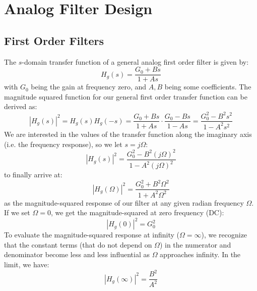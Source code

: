 \section{Analog Filter Design}

\subsection{First Order Filters}
The $s$-domain transfer function of a general analog first order filter is given by:
\begin{equation}
 H_g(s) = \frac{G_0 + B s}{1 + A s}
\end{equation}
with $G_0$ being the gain at frequency zero, and $A, B$ being some coefficients. The magnitude squared function for our general first order transfer function can be derived as:
\begin{equation}
 |H_g(s)|^2 = H_g(s) H_g(-s) 
 = \frac{G_0 + B s}{1 + A s} \cdot \frac{G_0 - B s}{1 - A s} 
 = \frac{G_0^2 - B^2 s^2}{1 - A^2 s^2} 
\end{equation}
We are interested in the values of the transfer function along the imaginary axis (i.e. the frequency response), so we let $s = j \Omega$:
\begin{equation}
 |H_g(s)|^2 = \frac{G_0^2 - B^2 (j \Omega)^2}{1 - A^2 (j \Omega)^2} 
\end{equation}
to finally arrive at:
\begin{equation}
 \label{Eq:MagSqInGeneral}
 |H_g(\Omega)|^2 = \frac{G_0^2 + B^2 \Omega^2}{1 + A^2 \Omega^2} 
\end{equation}
as the magnitude-squared response of our filter at any given radian frequency $\Omega$. If we set $\Omega = 0$, we get the magnitude-squared at zero frequency (DC):
\begin{equation}
 \label{Eq:MagSqAtZeroGeneral}
 |H_g(0)|^2 = G_0^2
\end{equation}
To evaluate the magnitude-squared response at infinity ($\Omega = \infty$), we recognize that the constant terms (that do not depend on $\Omega$) in the numerator and denominator become less and less influential as $\Omega$ approaches infinity. In the limit, we have:
\begin{equation}
 \label{Eq:MagSqAtInfGeneral}
 |H_g(\infty)|^2 = \frac{B^2}{A^2}
\end{equation}

